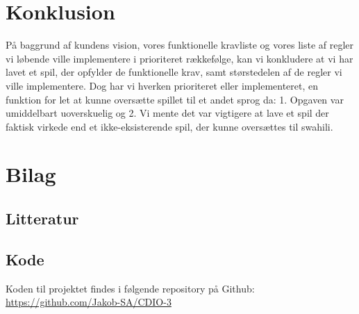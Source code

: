 \documentclass{article}
\begin{document}
\section{Konklusion}
På baggrund af kundens vision, vores funktionelle kravliste og vores liste af regler vi løbende ville implementere i prioriteret rækkefølge, kan vi konkludere at vi har lavet et spil, der opfylder de funktionelle krav, samt størstedelen af  de regler vi ville implementere. Dog har vi hverken prioriteret eller implementeret, en funktion for let at kunne oversætte spillet til et andet sprog da: 1. Opgaven var umiddelbart uoverskuelig og 2. Vi mente det var vigtigere at lave et spil der faktisk virkede end et ikke-eksisterende spil, der kunne oversættes til swahili.
\\
\section{Bilag}
\subsection{Litteratur}
\subsection{Kode}
Koden til projektet findes i følgende repository på Github: \href{https://github.com/Jakob-SA/CDIO-}{https://github.com/Jakob-SA/CDIO-3}
\end{document}
